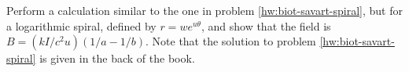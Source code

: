 Perform a calculation similar to the one in problem \ref{hw:biot-savart-spiral}, but for a logarithmic spiral, defined by $r=we^{u\theta}$, and
show that the field is $B=(kI/c^2u)(1/a-1/b)$.
Note that the solution to problem  \ref{hw:biot-savart-spiral} is given in the back of the book.
